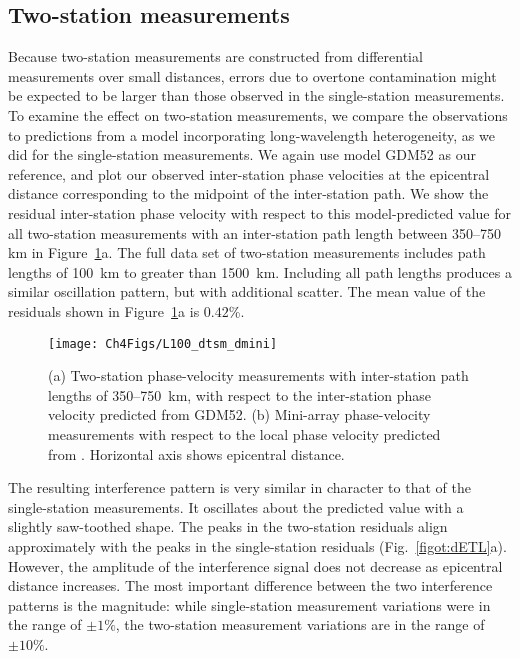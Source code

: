 \documentclass[12pt,oneside]{book}
\begin{document}
\subsection{Two-station measurements}
Because two-station measurements are constructed from differential measurements over small distances, errors due to overtone contamination might be expected to be larger than those observed in the single-station measurements. To examine the effect on two-station measurements, we compare the observations to predictions from a model incorporating long-wavelength heterogeneity, as we did for the single-station measurements. We again use model GDM52 as our reference, and plot our observed inter-station phase velocities at the epicentral distance corresponding to the midpoint of the inter-station path. We show the residual inter-station phase velocity with respect to this model-predicted value for all two-station measurements with an inter-station path length between 350--750 km in Figure~\ref{figot:darray}a. The full data set of two-station measurements includes path lengths of 100~km to greater than 1500~km. Including all path lengths produces a similar oscillation pattern, but with additional scatter. The mean value of the residuals shown in Figure~\ref{figot:darray}a is $0.42$\%.

\begin{figure} 
\begin{center}
\texttt{[image: Ch4Figs/L100\_dtsm\_dmini]} 
\caption[Overtone interference in two-station and mini-array phase-velocity measurements]{(a) Two-station phase-velocity measurements with inter-station path lengths of 350--750~km, with respect to the inter-station phase velocity predicted from GDM52. (b) Mini-array phase-velocity measurements with respect to the local phase velocity predicted from \citet{Fosteretal2014}. Horizontal axis shows epicentral distance. }
\label{figot:darray}
\end{center}
\end{figure}
%

The resulting interference pattern is very similar in character to that of the single-station measurements. It oscillates about the predicted value with a slightly saw-toothed shape. The peaks in the two-station residuals align approximately with the peaks in the single-station residuals (Fig.~\ref{figot:dETL}a). However, the amplitude of the interference signal does not decrease as epicentral distance increases. The most important difference between the two interference patterns is the magnitude: while single-station measurement variations were in the range of $\pm1\%$, the two-station measurement variations are in the range of $\pm10\%$. 
\end{document}
